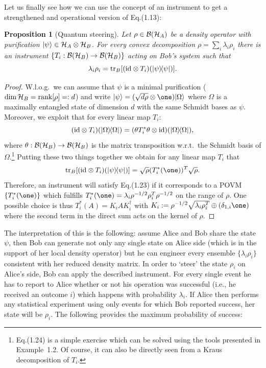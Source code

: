 \documentclass[11pt,a4paper]{article}
\theoremstyle{plain}
\newtheorem{proposition}{Proposition}[section]
\theoremstyle{definition}
\theoremstyle{remark}
\numberwithin{equation}{section}
\begin{document}
Let us finally see how we can use the concept of an instrument to get a strengthened and operational version of Eq.(1.13):

\begin{proposition}[Quantum steering]
    Let $\rho\in \mathcal{B}(\mathcal{H}_A)$ be a density operator with purification $|\psi\rangle\in \mathcal{H}_A\otimes \mathcal{H}_B$. For every convex decomposition $\rho=\sum_i \lambda_i\rho_i$ there is an instrument $\{T_i:\mathcal{B}(\mathcal{H}_B)\to \mathcal{B}(\mathcal{H}_B)\}$ acting on Bob's system such that
    \begin{equation}
        \lambda_i\rho_i = \operatorname{tr}_B[(\mathrm{id}\otimes T_i)(|\psi\rangle\!\langle\psi|)].
    \end{equation}
\end{proposition}

\begin{proof}
    W.l.o.g.\ we can assume that $\psi$ is a minimal purification ($\dim\mathcal{H}_B=\operatorname{rank}[\rho]=:d$) and write $\ket{\psi}=(\sqrt{d\rho}\otimes \one)\ket{\Omega}$ where $\Omega$ is a maximally entangled state of dimension $d$ with the same Schmidt bases as $\psi$. Moreover, we exploit that for every linear map $T_i$:
    \begin{equation}
        (\mathrm{id}\otimes T_i)(|\Omega\rangle\!\langle\Omega|)
        = (\theta T_i^\ast \theta \otimes \mathrm{id})(|\Omega\rangle\!\langle\Omega|),
    \end{equation}
    where $\theta:\mathcal{B}(\mathcal{H}_B)\to \mathcal{B}(\mathcal{H}_B)$ is the matrix transposition w.r.t.\ the Schmidt basis of $\Omega$.\footnote{Eq.(1.24) is a simple exercise which can be solved using the tools presented in Example~1.2. Of course, it can also be directly seen from a Kraus decomposition of $T_i$.} Putting these two things together we obtain for any linear map $T_i$ that
    \begin{equation}
        \tr_B[(\id\otimes T_i)(\ketbra{\psi}{\psi})]
        = \sqrt{\rho} (T_i^\ast(\one))^T\sqrt{\rho}.
    \end{equation}
    Therefore, an instrument will satisfy Eq.(1.23) if it corresponds to a POVM $\{T_i^\ast(\one)\}$ which fulfills $T_i^\ast(\one)=\lambda_i\rho^{-1/2}\rho_i^T\rho^{-1/2}$ on the range of $\rho$. One possible choice is thus $T_i^\ast(A)=K_iAK_i^\dagger$ with $K_i:=\rho^{-1/2}\sqrt{\lambda_i\rho_i^T}\oplus (\delta_{1,i}\one)$ where the second term in the direct sum acts on the kernel of $\rho$.
\end{proof}

The interpretation of this is the following: assume Alice and Bob share the state $\psi$, then Bob can generate not only any single state on Alice side (which is in the support of her local density operator) but he can engineer every ensemble $\{\lambda_i\rho_i\}$ consistent with her reduced density matrix. In order to `steer' the state $\rho_i$ on Alice's side, Bob can apply the described instrument. For every single event he has to report to Alice whether or not his operation was successful (i.e., he received an outcome $i$) which happens with probability $\lambda_i$. If Alice then performs any statistical experiment using only events for which Bob reported success, her state will be $\rho_i$. The following provides the maximum probability of success:
\end{document}
